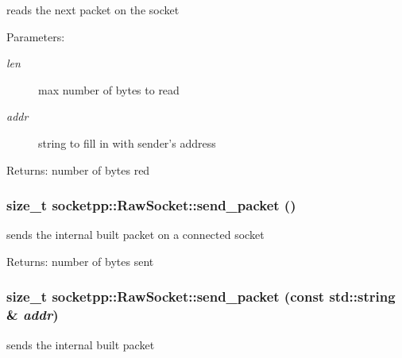 reads the next packet on the socket 

\begin{Desc}
\item[Parameters:]
\begin{description}
\item[{\em len}]max number of bytes to read \item[{\em addr}]string to fill in with sender's address \end{description}
\end{Desc}
\begin{Desc}
\item[Returns:]number of bytes red \end{Desc}
\hypertarget{classsocketpp_1_1RawSocket_e987bb77fd3ac6d0e99b5311ff81c1ea}{
\subsubsection[{send\_\-packet}]{\setlength{\rightskip}{0pt plus 5cm}size\_\-t socketpp::RawSocket::send\_\-packet ()}}
\label{classsocketpp_1_1RawSocket_e987bb77fd3ac6d0e99b5311ff81c1ea}


sends the internal built packet on a connected socket 

\begin{Desc}
\item[Returns:]number of bytes sent \end{Desc}
\hypertarget{classsocketpp_1_1RawSocket_6dfb29dbfedf61d8f082dc1893320d42}{
\subsubsection[{send\_\-packet}]{\setlength{\rightskip}{0pt plus 5cm}size\_\-t socketpp::RawSocket::send\_\-packet (const std::string \& {\em addr})}}
\label{classsocketpp_1_1RawSocket_6dfb29dbfedf61d8f082dc1893320d42}


sends the internal built packet 

